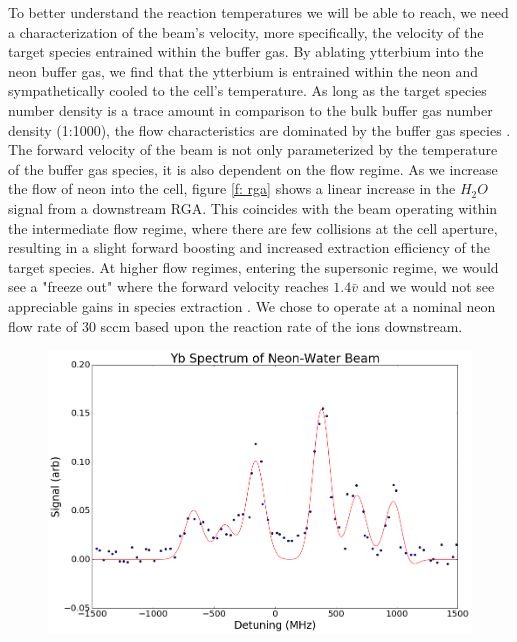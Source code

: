 \documentclass[a4paper]{article}
\begin{document}
To better understand the reaction temperatures we will be able to reach, we need a characterization of the beam's velocity, more specifically, the velocity of the target species entrained within the buffer gas. By ablating ytterbium into the neon buffer gas, we find that the ytterbium is entrained within the neon and sympathetically cooled to the cell's temperature. As long as the target species number density is a trace amount in comparison to the bulk buffer gas number density (1:1000), the flow characteristics are dominated by the buffer gas species \cite{Hutzler2012}. The forward velocity of the beam is not only parameterized by the temperature of the buffer gas species, it is also dependent on the flow regime. As we increase the flow of neon into the cell, figure \ref{f: rga} shows a linear increase in the $H_2O$ signal from a downstream RGA. This coincides with the beam operating within the intermediate flow regime, where there are few collisions at the cell aperture, resulting in a slight forward boosting and increased extraction efficiency of the target species. At higher flow regimes, entering the supersonic regime, we would see a "freeze out" where the forward velocity reaches $1.4\bar{v}$ and we would not see appreciable gains in species extraction \cite{Hutzler2012}. We chose to operate at a nominal neon flow rate of 30 sccm based upon the reaction rate of the ions downstream.

\begin{figure}[H]
\centering
\includegraphics[width=1\textwidth]{yb_spectrum_long.png}
\caption{\label{f: yb_spectrum}}
\end{figure}




\end{document}
